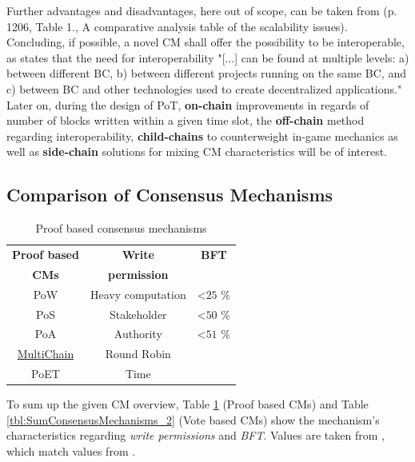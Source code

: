 Further advantages and disadvantages, here out of scope, can be taken from \citet{Kim.2018} (p. 1206, Table 1., A comparative analysis table of the scalability issues).
Concluding, if possible, a novel \gls{CM} shall offer the possibility to be interoperable, as \citet[81]{Besancon.2019} states that the need for interoperability
"[...] can be found at multiple levels: a) between different BC, b) between different projects running on the same BC, and c) between BC and other technologies used to create decentralized applications." \\
Later on, during the design of \gls{PoT}, \textbf{on-chain} improvements in regards of number of blocks written within a given time slot,
the \textbf{off-chain} method regarding interoperability,
\textbf{child-chains} to counterweight in-game mechanics as well as 
\textbf{side-chain} solutions for mixing \gls{CM} characteristics will be of interest.

\FloatBarrier



\subsection{Comparison of Consensus Mechanisms}

\begin{table}
	\centering
	\begin{tabularx}{0.575\textwidth}{ c | c | c }
		\textbf{Proof based} & \textbf{Write} & \textbf{\gls{BFT}} \\
		\textbf{\gls{CM}s} & \textbf{permission} & \\ \hline \hline
		\gls{PoW} & Heavy computation & \textless $25$ \% \\ \hline
		\gls{PoS} & Stakeholder & \textless $50$ \%  \\ \hline
		\gls{PoA} & Authority & \textless $51$ \%  \\ \hline
		\hyperref[sec:MultiChain]{MultiChain} & Round Robin & \textminus  \\ \hline
		\gls{PoET} & Time & \textminus \\ \hline \hline
	\end{tabularx}
	\caption{Proof based consensus mechanisms \cite[5]{Khan.2020}}
	\label{tbl:SumConsensusMechanisms_1}
\end{table}

\noindent To sum up the given \gls{CM} overview, Table \ref{tbl:SumConsensusMechanisms_1} (Proof based \gls{CM}s) and Table \ref{tbl:SumConsensusMechanisms_2} (Vote based \gls{CM}s)
show the mechanism's characteristics regarding \textit{write permissions} and \textit{\gls{BFT}}.
Values are taken from \citet[5]{Khan.2020}, which match
values from \citet[55]{Dib.2018}.

